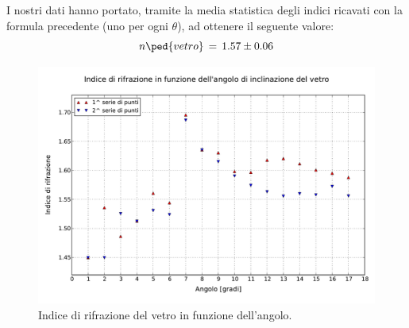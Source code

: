 I nostri dati hanno portato, tramite la media statistica degli indici ricavati con la formula precedente (uno per ogni $\theta$),
ad ottenere il seguente valore:
\begin{equation}
	n\ped{vetro} \, = \, 1.57 \pm 0.06
\end{equation}

\begin{figure}[t]
    \centering
        \includegraphics[width=\textwidth]{lol.pdf}
        \caption{Indice di rifrazione del vetro in funzione dell'angolo.}
        \label{fig:enne_theta}
\end{figure}
